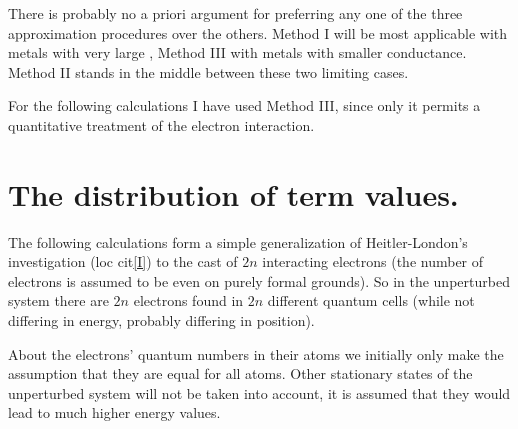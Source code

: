 \begin{paper}{1}
There is probably no a priori argument for preferring any one of the three approximation procedures over the others. Method I will be most applicable with metals with very large , Method III with metals with smaller conductance. Method II stands in the middle between these two limiting cases.

For the following calculations I have used Method III, since only it permits a quantitative treatment of the electron interaction.

\section{The distribution of term values.} The following calculations form a simple generalization of Heitler-London's investigation (loc cit\ref{I}) to the cast of $2n$ interacting electrons (the number of electrons is assumed to be even on purely formal grounds). So in the unperturbed system there are $2n$ electrons found in $2n$ different quantum cells (while not differing in energy, probably differing in position).

About the electrons' quantum numbers in their atoms we initially only make the assumption that they are equal for all atoms. Other stationary states of the unperturbed system will not be taken into account, it is assumed that they would lead to much higher energy values.


\end{paper}
